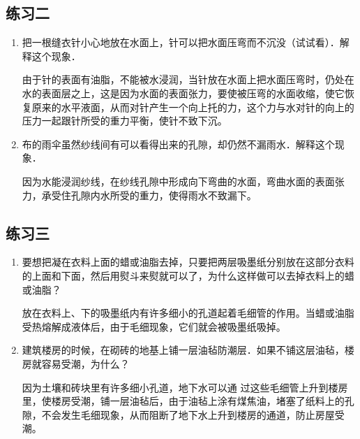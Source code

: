 \subsection{练习二}

\begin{enumerate}
   \item 把一根缝衣针小心地放在水面上，针可以把水面压弯而不沉没（试试看）．解释这个现象．

   \begin{solution}
 由于针的表面有油脂，不能被水浸润，当针放在水面上把水面压弯时，仍处在水的表面层之上，这是因为水面的表面张力，要使被压弯的水面收缩，使它恢复原来的水平液面，从而对针产生一个向上托的力，这个力与水对针的向上的压力一起跟针所受的重力平衡，使针不致下沉。  
   \end{solution}
   \item 布的雨伞虽然纱线间有可以看得出来的孔隙，却仍然不漏雨水．解释这个现象．

   \begin{solution}
    因为水能浸润纱线，在纱线孔隙中形成向下弯曲的水面，弯曲水面的表面张力，承受住孔隙内水所受的重力，使得雨水不致漏下。
   \end{solution}
\end{enumerate}



\subsection{练习三}
\begin{enumerate}
   \item 要想把凝在衣料上面的蜡或油脂去掉，只要把两层吸墨纸分别放在这部分衣料的上面和下面，然后用熨斗来熨就可以了，为什么这样做可以去掉衣料上的蜡或油脂？

   \begin{solution}
    放在衣料上、下的吸墨纸内有许多细小的孔道起着毛细管的作用。当蜡或油脂受热熔解成液体后，由于毛细现象，它们就会被吸墨纸吸掉。
   \end{solution}
\item 建筑楼房的时候，在砌砖的地基上铺一层油毡防潮层．如果不铺这层油毡，楼房就容易受潮，为什么？

\begin{solution}
    因为土壤和砖块里有许多细小孔道，地下水可以通
    过这些毛细管上升到楼房里，使楼房受潮，铺一层油毡后，由于油毡上涂有煤焦油，堵塞了纸料上的孔隙，不会发生毛细现象，从而阻断了地下水上升到楼房的通道，防止房屋受潮。
\end{solution}
\end{enumerate}

